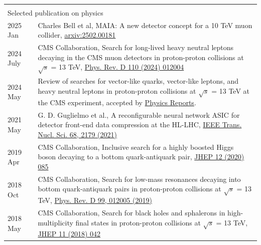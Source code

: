 \documentclass[letterpaper,11pt,oneside]{article}
\begin{document}
{\begin{tabular}{p{0.12\linewidth}  p{0.88\linewidth}}
&\\
\multicolumn{2}{l}{ \Large{Selected publication on physics} }   \\ \hline
2025 Jan & Charles Bell et al, MAIA: A new detector concept for a 10 TeV muon collider, \href{https://arxiv.org/abs/2502.00181}{arxiv:2502.00181}\\
2024 July & CMS Collaboration, Search for long-lived heavy neutral leptons decaying in the CMS muon detectors in proton-proton collisions at  $\sqrt{s}$ = 13 TeV, \href{https://doi.org/10.1103/PhysRevD.110.012004}{Phys. Rev. D 110 (2024) 012004}\\
2024 May & Review of searches for vector-like quarks, vector-like leptons, and heavy neutral leptons in proton-proton collisions at $\sqrt{s}$ = 13 TeV at the CMS experiment, accepted by \href{https://arxiv.org/abs/2405.17605}{Physics Reports}.\\
2021 May & G. D. Guglielmo et al., A reconfigurable neural network ASIC for detector front-end data compression at the HL-LHC, \href{https://ieeexplore.ieee.org/document/9447722}{IEEE Trans. Nucl. Sci. 68, 2179 (2021)}\\
2019 Apr & CMS Collaboration, Inclusive search for a highly boosted Higgs boson decaying to a bottom quark-antiquark pair, \href{https://link.springer.com/article/10.1007/JHEP12(2020)085}{JHEP 12 (2020) 085} \\
2018 Oct & CMS Collaboration, Search for low-mass resonances decaying into bottom quark-antiquark pairs in proton-proton collisions at $\sqrt{s}$ = 13 TeV,  \href{https://journals.aps.org/prd/abstract/10.1103/PhysRevD.99.012005}{Phys. Rev. D 99, 012005 (2019)}\\
2018 May & CMS Collaboration, Search for black holes and sphalerons in high-multiplicity final states in proton-proton collisions at $\sqrt{s}$ = 13 TeV,  \href{https://link.springer.com/article/10.1007/JHEP11(2018)042}{JHEP 11 (2018) 042}\\

\end{tabular}
}
\end{document}
